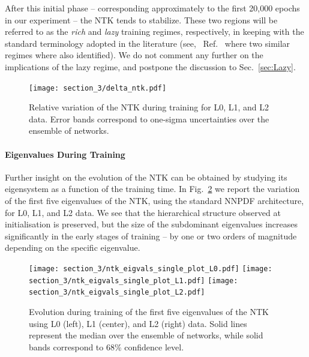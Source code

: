After this initial phase -- corresponding approximately to the first 20,000
epochs in our experiment -- the NTK tends to stabilize. These two regions will
be referred to as the \textit{rich} and \textit{lazy} training regimes,
respectively, in keeping with the standard terminology adopted in the literature
(see, \eg\ Ref.~\cite{fort2020dlvk} where two similar regimes where also
identified). We do not comment any further on the implications of the lazy
regime, and postpone the discussion to Sec.~\ref{sec:Lazy}.

\begin{figure}[t]
  \centering
  \texttt{[image: section\_3/delta\_ntk.pdf]}
  \caption{Relative variation of the NTK during training for L0, L1, and
  L2 data. Error bands correspond to one-sigma uncertainties over the ensemble
  of networks.}
  \label{fig:NTKTime}
\end{figure}

\FloatBarrier

\paragraph{Eigenvalues During Training}

Further insight on the evolution of the NTK can be obtained by studying its
eigensystem as a function of the training time. In Fig.~\ref{fig:NTKEigvalsTime}
we report the variation of the first five eigenvalues of the NTK, using the
standard NNPDF architecture, for L0, L1, and L2 data. We see that the
hierarchical structure observed at initialisation is preserved, but the size of
the subdominant eigenvalues increases significantly in the early stages of
training -- by one or two orders of magnitude depending on the specific
eigenvalue. 

\begin{figure}[ht]
  \centering
  \texttt{[image: section\_3/ntk\_eigvals\_single\_plot\_L0.pdf]}
  \texttt{[image: section\_3/ntk\_eigvals\_single\_plot\_L1.pdf]}
  \texttt{[image: section\_3/ntk\_eigvals\_single\_plot\_L2.pdf]} 
  \caption{Evolution during training of the first five eigenvalues of the NTK
  using L0 (left), L1 (center), and L2 (right) data. Solid lines represent the
  median over the ensemble of networks, while solid bands correspond to 68\%
  confidence level.}
  \label{fig:NTKEigvalsTime}
\end{figure}

